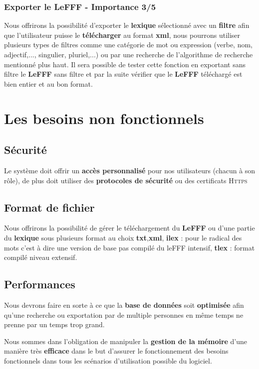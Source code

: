  
\subsubsection{Exporter le LeFFF - Importance 3/5}

{Nous offrirons la possibilité d'exporter le \textbf{lexique} sélectionné avec un \textbf{filtre} afin que l'utilisateur puisse le \textbf{télécharger} au format \textbf{xml}, nous pourrons utiliser plusieurs types de filtres comme une catégorie de mot ou expression (verbe, nom, adjectif,..., singulier, pluriel,...) ou par une recherche de l'algorithme de recherche mentionné plus haut. Il sera possible de tester cette fonction en exportant sans filtre le \textbf{LeFFF} sans filtre et par la suite vérifier que le \textbf{LeFFF} téléchargé est bien entier et au bon format.\par}



\section{Les besoins non fonctionnels}

\subsection{Sécurité}
{Le système doit offrir un \textbf{accès personnalisé} pour nos utilisateurs (chacun à son rôle), de plus doit utiliser des \textbf{protocoles de sécurité} ou des certificats \textsc{Https} }

\subsection{Format de fichier}
Nous offrirons la possibilité de gérer le téléchargement du \textbf{LeFFF} ou d'une partie du \textbf{lexique} sous plusieurs format au choix  \textbf{txt},\textbf{xml}, \textbf{ilex} : pour le radical des mots c'est à dire une version de base pas compilé du leFFF intensif, \textbf{tlex} : format compilé niveau extensif.

\subsection{Performances}

{Nous devrons faire en sorte à ce que la \textbf{base de données} soit \textbf{optimisée} afin qu'une recherche ou exportation par de multiple personnes en même temps ne prenne par un temps trop grand.\par}
Nous sommes dans l'obligation de manipuler la \textbf{gestion de la mémoire} d'une manière très \textbf{efficace} dans le but d'assurer le fonctionnement des besoins fonctionnels dans tous les scénarios d'utilisation possible du logiciel. 

